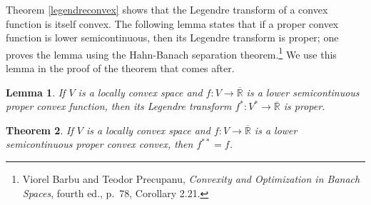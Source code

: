\documentclass{article}
\newcommand{\extreals}{\overline{\mathbb{R}}}
\newtheorem{theorem}{Theorem}
\newtheorem{lemma}[theorem]{Lemma}
\theoremstyle{definition}
\begin{document}
Theorem \ref{legendreconvex} shows that the Legendre transform of a convex function is itself convex. The following
lemma states that if a proper convex function is lower semicontinuous, then its Legendre transform is proper; one
proves the lemma using the Hahn-Banach separation theorem.\footnote{Viorel Barbu and Teodor Precupanu, {\em Convexity and Optimization in Banach Spaces},
fourth ed., p.~78, Corollary 2.21.}
 We
use this lemma in the proof of the theorem that comes after.

\begin{lemma}
If $V$ is a locally convex space and $f:V \to \extreals$ is a lower semicontinuous proper convex function, then its Legendre
transform $f^*:V^* \to \extreals$ is proper.
\label{properlemma}
\end{lemma}


\begin{theorem}
If $V$ is a locally convex space and $f:V \to \extreals$ is a lower semicontinuous proper convex convex, then $f^{**}=f$.
\end{theorem}
\end{document}
